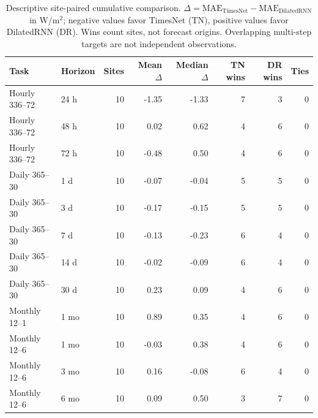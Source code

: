 \begin{table}[htbp]
\centering
\caption{Descriptive site-paired cumulative comparison. $\Delta=\mathrm{MAE}_{\mathrm{TimesNet}}-\mathrm{MAE}_{\mathrm{DilatedRNN}}$ in W/m$^2$; negative values favor TimesNet (TN), positive values favor DilatedRNN (DR). Wins count sites, not forecast origins. Overlapping multi-step targets are not independent observations.}
\label{tab:vitorias-timesnet-dilatedrnn}
\small
\setlength{\tabcolsep}{5pt}
\begin{tabular*}{\textwidth}{@{\extracolsep{\fill}}llrrrrrr@{}}
\toprule
Task & Horizon & Sites & Mean $\Delta$ & Median $\Delta$ & TN wins & DR wins & Ties \\
\midrule
Hourly 336--72 & 24 h & 10 & -1.35 & -1.33 & 7 & 3 & 0 \\
Hourly 336--72 & 48 h & 10 & 0.02 & 0.62 & 4 & 6 & 0 \\
Hourly 336--72 & 72 h & 10 & -0.48 & 0.50 & 4 & 6 & 0 \\
\addlinespace
Daily 365--30 & 1 d & 10 & -0.07 & -0.04 & 5 & 5 & 0 \\
Daily 365--30 & 3 d & 10 & -0.17 & -0.15 & 5 & 5 & 0 \\
Daily 365--30 & 7 d & 10 & -0.13 & -0.23 & 6 & 4 & 0 \\
Daily 365--30 & 14 d & 10 & -0.02 & -0.09 & 6 & 4 & 0 \\
Daily 365--30 & 30 d & 10 & 0.23 & 0.09 & 4 & 6 & 0 \\
\addlinespace
Monthly 12--1 & 1 mo & 10 & 0.89 & 0.35 & 4 & 6 & 0 \\
\addlinespace
Monthly 12--6 & 1 mo & 10 & -0.03 & 0.38 & 4 & 6 & 0 \\
Monthly 12--6 & 3 mo & 10 & 0.16 & -0.08 & 6 & 4 & 0 \\
Monthly 12--6 & 6 mo & 10 & 0.09 & 0.50 & 3 & 7 & 0 \\
\bottomrule
\end{tabular*}
\end{table}
